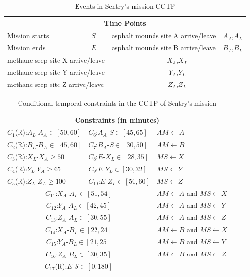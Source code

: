 \documentclass[jair,twoside,11pt,theapa]{article}
\begin{document}
\begin{table}[h!]
	\centering
	\begin{tabular}{| m{3cm} m{1.5cm} | m{6cm} m{1.5cm} |}
		\hline
		\multicolumn{4}{|c|}{\textbf{Time Points}} \\
		\hline
		Mission starts & $S$ & asphalt
		mounds site A arrive/leave & $A_A$,$A_L$ \\
		Mission ends & $E$ & asphalt
		mounds site B arrive/leave & $B_A$,$B_L$ \\
		\hline
		\multicolumn{2}{|l}{methane seep site X arrive/leave} &
		\multicolumn{2}{c|}{$X_A$,$X_L$} \\
		\multicolumn{2}{|l}{methane seep site Y arrive/leave} &
		\multicolumn{2}{c|}{$Y_A$,$Y_L$} \\
		\multicolumn{2}{|l}{methane seep site Z arrive/leave} &
		\multicolumn{2}{c|}{$Z_A$,$Z_L$} \\
		\hline
	\end{tabular}
	\caption{Events in Sentry's mission CCTP}
	\label{table:events}
\end{table}



\begin{table}[h!]	
	\centering
	\begin{tabular}{| m{4.2cm} m{4.2cm} m{4.5cm}|}
		\hline
		\multicolumn{3}{|c|}{\textbf{Constraints (in minutes)}} \\
		\hline		
		$C_1$(R):$A_L$-$A_A\in[50,60]$ & $C_6$:$A_A$-$S\in[45,65]$ & $AM \leftarrow A$ \\ 
		$C_2$(R):$B_L$-$B_A\in[45,60]$ & $C_7$:$B_A$-$S\in[30,50]$ & $AM \leftarrow B$ \\ 
		$C_3$(R):$X_L$-$X_A\geq60$ & $C_8$:$E$-$X_L\in[28,35]$ & $MS \leftarrow X$ \\ 
		$C_4$(R):$Y_L$-$Y_A\geq65$ & $C_9$:$E$-$Y_L\in[30,32]$ & $MS \leftarrow Y$ \\ 
		$C_5$(R):$Z_L$-$Z_A\geq100$ & $C_{10}$:$E$-$Z_L\in[50,60]$ & $MS \leftarrow Z$ \\ 
		\hline
		\multicolumn{2}{|c}{$C_{11}$:$X_A$-$A_L\in[51,54]$} & $AM
			\leftarrow A$ and $MS \leftarrow X$ \\ 
		\multicolumn{2}{|c}{$C_{12}$:$Y_A$-$A_L\in[42,45]$} &$AM
			\leftarrow A$ and $MS \leftarrow Y$ \\ 
		\multicolumn{2}{|c}{$C_{13}$:$Z_A$-$A_L\in[30,55]$} & $AM
			\leftarrow A$ and $MS \leftarrow Z$ \\ 
		\multicolumn{2}{|c}{$C_{14}$:$X_A$-$B_L\in[22,24]$} & $AM
			\leftarrow B$ and $MS \leftarrow X$ \\ 
		\multicolumn{2}{|c}{$C_{15}$:$Y_A$-$B_L\in[21,25]$} & $AM
			\leftarrow B$ and $MS \leftarrow Y$ \\ 
		\multicolumn{2}{|c}{$C_{16}$:$Z_A$-$B_L\in[30,35]$} & $AM
			\leftarrow B$ and $MS \leftarrow Z$ \\ \hline
		
		\multicolumn{2}{|c}{$C_{17}$(R):$E$-$S\in[0,180]$} & 
		\\
		\hline
	\end{tabular}
	\caption{Conditional temporal constraints in the CCTP of Sentry's mission}
	\label{table:constraints}
\end{table}
\end{document}
